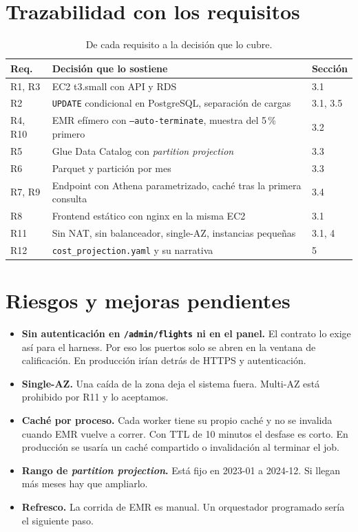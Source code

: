 \documentclass[11pt,letterpaper]{article}
\begin{document}
\section{Trazabilidad con los requisitos}
\begin{table}[H]
\centering
\begin{tabular}{C{1.2cm} L{6.0cm} L{7.2cm}}
\toprule
\textbf{Req.} & \textbf{Decisión que lo sostiene} & \textbf{Sección} \\
\midrule
R1, R3 & EC2 t3.small con API y RDS & 3.1 \\
R2 & \texttt{UPDATE} condicional en PostgreSQL, separación de cargas & 3.1, 3.5 \\
R4, R10 & EMR efímero con \texttt{--auto-terminate}, muestra del 5\,\% primero & 3.2 \\
R5 & Glue Data Catalog con \emph{partition projection} & 3.3 \\
R6 & Parquet y partición por mes & 3.3 \\
R7, R9 & Endpoint con Athena parametrizado, caché tras la primera consulta & 3.4 \\
R8 & Frontend estático con nginx en la misma EC2 & 3.1 \\
R11 & Sin NAT, sin balanceador, single-AZ, instancias pequeñas & 3.1, 4 \\
R12 & \texttt{cost\_projection.yaml} y su narrativa & 5 \\
\bottomrule
\end{tabular}
\caption{De cada requisito a la decisión que lo cubre.}
\end{table}

\section{Riesgos y mejoras pendientes}
\begin{itemize}
  \item \textbf{Sin autenticación en \texttt{/admin/flights} ni en el panel.} El contrato lo exige así para el harness. Por eso los puertos solo se abren en la ventana de calificación. En producción irían detrás de HTTPS y autenticación.
  \item \textbf{Single-AZ.} Una caída de la zona deja el sistema fuera. Multi-AZ está prohibido por R11 y lo aceptamos.
  \item \textbf{Caché por proceso.} Cada worker tiene su propio caché y no se invalida cuando EMR vuelve a correr. Con TTL de 10 minutos el desfase es corto. En producción se usaría un caché compartido o invalidación al terminar el job.
  \item \textbf{Rango de \emph{partition projection}.} Está fijo en 2023-01 a 2024-12. Si llegan más meses hay que ampliarlo.
  \item \textbf{Refresco.} La corrida de EMR es manual. Un orquestador programado sería el siguiente paso.
\end{itemize}
\end{document}
